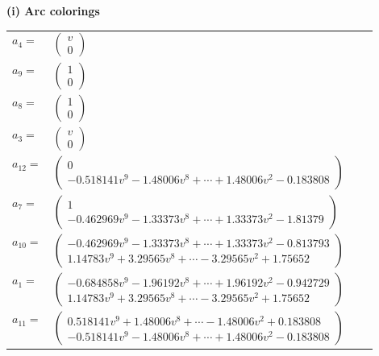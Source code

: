 \documentclass[1p]{elsarticle_modified}
\theoremstyle{definition}
\begin{document}
\flushleft \textbf{(i) Arc colorings}\\
\begin{tabular}{m{7pt} m{180pt} m{7pt} m{180pt} }
\flushright $a_{4}=$&$\begin{pmatrix}v\\0\end{pmatrix}$ \\
\flushright $a_{9}=$&$\begin{pmatrix}1\\0\end{pmatrix}$ \\
\flushright $a_{8}=$&$\begin{pmatrix}1\\0\end{pmatrix}$ \\
\flushright $a_{3}=$&$\begin{pmatrix}v\\0\end{pmatrix}$ \\
\flushright $a_{12}=$&$\begin{pmatrix}0\\-0.518141 v^{9}-1.48006 v^{8}+\cdots+1.48006 v^{2}-0.183808\end{pmatrix}$ \\
\flushright $a_{7}=$&$\begin{pmatrix}1\\-0.462969 v^{9}-1.33373 v^{8}+\cdots+1.33373 v^{2}-1.81379\end{pmatrix}$ \\
\flushright $a_{10}=$&$\begin{pmatrix}-0.462969 v^{9}-1.33373 v^{8}+\cdots+1.33373 v^{2}-0.813793\\1.14783 v^{9}+3.29565 v^{8}+\cdots-3.29565 v^{2}+1.75652\end{pmatrix}$ \\
\flushright $a_{1}=$&$\begin{pmatrix}-0.684858 v^{9}-1.96192 v^{8}+\cdots+1.96192 v^{2}-0.942729\\1.14783 v^{9}+3.29565 v^{8}+\cdots-3.29565 v^{2}+1.75652\end{pmatrix}$ \\
\flushright $a_{11}=$&$\begin{pmatrix}0.518141 v^{9}+1.48006 v^{8}+\cdots-1.48006 v^{2}+0.183808\\-0.518141 v^{9}-1.48006 v^{8}+\cdots+1.48006 v^{2}-0.183808\end{pmatrix}$ \\

\end{tabular}
\end{document}
